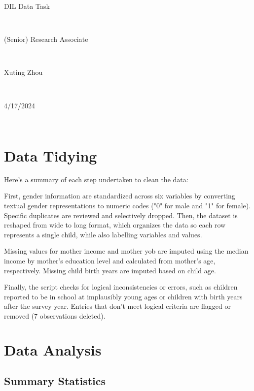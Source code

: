 \documentclass[10pt]{article}
\begin{document}
\begin{center}
\begin{LARGE}DIL Data Task \end{LARGE}
\\
\bigskip
\begin{LARGE}(Senior) Research Associate \end{LARGE} 
\\
\bigskip
\begin{large}Xuting Zhou\end{large}\\
\begin{large}4/17/2024\end{large}\\
\end{center}%

\vspace{-12pt}


\section{Data Tidying}

Here’s a summary of each step undertaken to clean the data:

First,  gender information are  standardized across six variables by converting textual gender representations to numeric codes ("0" for male and "1" for female). Specific duplicates are reviewed and selectively dropped. Then, the dataset is reshaped from wide to long format, which organizes the data so each row represents a single child, while also labelling variables and values. 

Missing values for mother income and mother yob are imputed using the median income by mother's education level and calculated from mother's age, respectively. Missing child birth years are imputed based on child age.

Finally, the script checks for logical inconsistencies or errors, such as children reported to be in school at implausibly young ages or children with birth years after the survey year. Entries that don't meet logical criteria are flagged or removed (7 observations deleted).



\section{ Data Analysis}

\subsection{Summary Statistics}
\begin{center}

\end{center}
\end{document}
